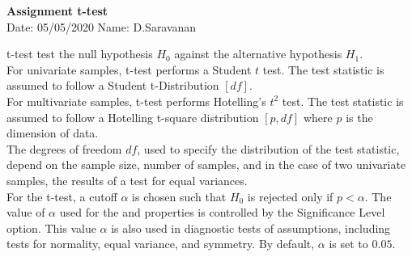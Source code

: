 \documentclass[a4paper,11pt,openright]{report}
\begin{document}
\singlespacing
\pagestyle{plain}

\begin{center}
\textbf{Assignment t-test} \\
Date: 05/05/2020 \hspace{2mm} Name: D.Saravanan
\end{center}

\vspace{10px}

\begin{adjustwidth}{15mm}{15mm}

t-test test the null hypothesis $H_{0}$ against the alternative hypothesis $H_{1}$. \\

For univariate samples, t-test performs a Student $t$ test. The test statistic is assumed to
follow a Student t-Distribution $[df]$. \\ 

For multivariate samples, t-test performs Hotelling's $t^{2}$ test. The test statistic is
assumed to follow a Hotelling t-square distribution $[p,df]$ where $p$ is the dimension of
data. \\

The degrees of freedom $df$, used to specify the distribution of the test statistic, depend 
on the sample size, number of samples, and in the case of two univariate samples, the 
results of a test for equal variances. \\ 

For the t-test, a cutoff $\alpha$ is chosen such that $H_{0}$ is rejected only if $p < 
\alpha$. The value of $\alpha$ used for the  and  properties is controlled by the Significance Level option. This value $\alpha$ 
is also used in diagnostic tests of assumptions, including tests for normality, equal 
variance, and symmetry. By default, $\alpha$ is set to $0.05$. \\

\end{adjustwidth}

\pagebreak
\end{document}
